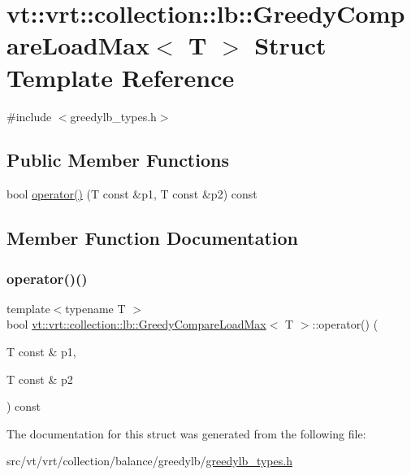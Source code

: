 \hypertarget{structvt_1_1vrt_1_1collection_1_1lb_1_1_greedy_compare_load_max}{}\section{vt\+:\+:vrt\+:\+:collection\+:\+:lb\+:\+:Greedy\+Compare\+Load\+Max$<$ T $>$ Struct Template Reference}
\label{structvt_1_1vrt_1_1collection_1_1lb_1_1_greedy_compare_load_max}


{\ttfamily \#include $<$greedylb\+\_\+types.\+h$>$}

\subsection*{Public Member Functions}
\begin{DoxyCompactItemize}
\item 
bool \hyperlink{structvt_1_1vrt_1_1collection_1_1lb_1_1_greedy_compare_load_max_aeb9fb03a02bee33290d2dec4db844359}{operator()} (T const \&p1, T const \&p2) const
\end{DoxyCompactItemize}


\subsection{Member Function Documentation}
\mbox{\label{structvt_1_1vrt_1_1collection_1_1lb_1_1_greedy_compare_load_max_aeb9fb03a02bee33290d2dec4db844359}} 
\subsubsection{\texorpdfstring{operator()()}{operator()()}}
{\footnotesize\ttfamily template$<$typename T $>$ \\
bool \hyperlink{structvt_1_1vrt_1_1collection_1_1lb_1_1_greedy_compare_load_max}{vt\+::vrt\+::collection\+::lb\+::\+Greedy\+Compare\+Load\+Max}$<$ T $>$\+::operator() (\begin{DoxyParamCaption}\item[{T const \&}]{p1,  }\item[{T const \&}]{p2 }\end{DoxyParamCaption}) const\hspace{0.3cm}{\ttfamily [inline]}}



The documentation for this struct was generated from the following file\+:\begin{DoxyCompactItemize}
\item 
src/vt/vrt/collection/balance/greedylb/\hyperlink{greedylb__types_8h}{greedylb\+\_\+types.\+h}\end{DoxyCompactItemize}
